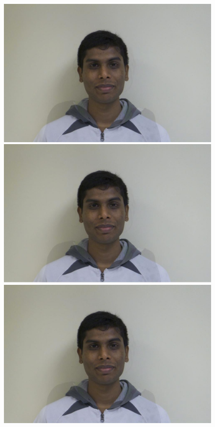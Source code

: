 \documentclass[11pt]{article}
\begin{document}
\begin{figure}[H]
\begin{center}
\includegraphics[scale=0.06]{figs/frames/morph_steinkirch_tangatur_52.jpg} 
\includegraphics[scale=0.06]{figs/frames/morph_steinkirch_tangatur_53.jpg} 
\includegraphics[scale=0.06]{figs/frames/morph_steinkirch_tangatur_54.jpg} 

\end{center}
\end{figure}
\end{document}
